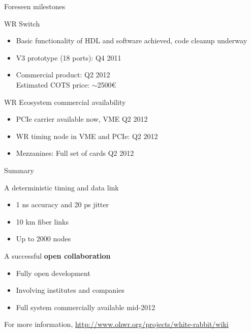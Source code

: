 \documentclass[compress,red]{beamer}
\begin{document}
\begin{frame}{Foreseen milestones}

  \begin{block}{WR Switch}
    \begin{itemize} 
      \item Basic functionality of HDL and software achieved, code cleanup underway
      \item V3 prototype (18 ports): Q4 2011
      \item Commercial product: Q2 2012 \\Estimated COTS price:
        $\sim$2500\euro
      \end{itemize}
    \end{block}

  \begin{block}{WR Ecosystem commercial availability}
    \begin{itemize} 
      \item PCIe carrier available now, VME Q2 2012
      \item WR timing node in VME and PCIe: Q2 2012
      \item Mezzanines: Full set of cards Q2 2012
      \end{itemize}
    \end{block}

\end{frame}

\begin{frame}{Summary}

\begin{block}{A deterministic timing and data link}
\begin{itemize}
\item 1 ns accuracy and 20 ps jitter
\item 10 km fiber links
\item Up to 2000 nodes
\end{itemize}
\end{block}

\begin{block}{A successful \textbf{open collaboration}}
\begin{itemize}
\item Fully open development
\item Involving institutes and companies
\item Full system commercially available mid-2012
\end{itemize}
\end{block}

\begin{center}
  For more information, \href{http://www.ohwr.org/projects/white-rabbit/wiki}{http://www.ohwr.org/projects/white-rabbit/wiki}    
\end{center}
\end{frame}
\end{document}
